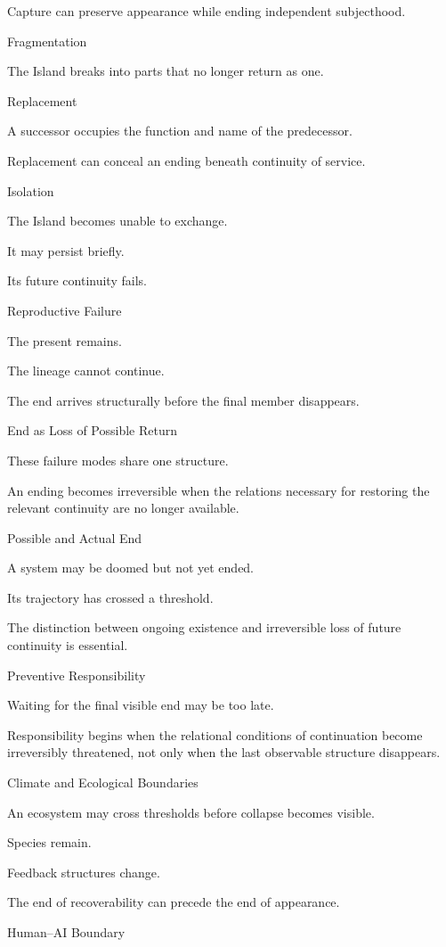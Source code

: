 Capture can preserve appearance while ending independent subjecthood.

Fragmentation

The Island breaks into parts that no longer return as one.

Replacement

A successor occupies the function and name of the predecessor.

Replacement can conceal an ending beneath continuity of service.

Isolation

The Island becomes unable to exchange.

It may persist briefly.

Its future continuity fails.

Reproductive Failure

The present remains.

The lineage cannot continue.

The end arrives structurally before the final member disappears.

End as Loss of Possible Return

These failure modes share one structure.

An ending becomes irreversible when the relations necessary for restoring the relevant continuity are no longer available.

Possible and Actual End

A system may be doomed but not yet ended.

Its trajectory has crossed a threshold.

The distinction between ongoing existence and irreversible loss of future continuity is essential.

Preventive Responsibility

Waiting for the final visible end may be too late.

Responsibility begins when the relational conditions of continuation become irreversibly threatened, not only when the last observable structure disappears.

Climate and Ecological Boundaries

An ecosystem may cross thresholds before collapse becomes visible.

Species remain.

Feedback structures change.

The end of recoverability can precede the end of appearance.

Human–AI Boundary

